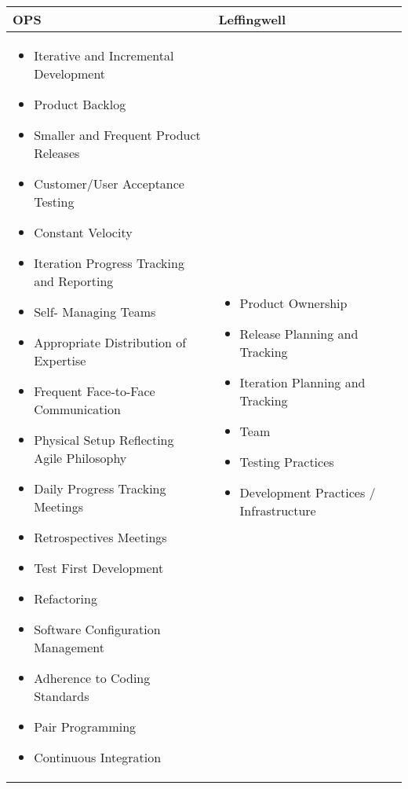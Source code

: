 \begin{tabular}{| p{7.5cm} | p{7cm} |}
	\hline
	\textbf{OPS} & \textbf{Leffingwell}  \\ \hline
     	\begin{itemize}
     		\item {\color{DeepPink1} Iterative and Incremental Development}
     	    \item {\color{DeepPink1}Product Backlog}
     		\item {\color{green4}Smaller and Frequent Product Releases} 
     		\item {\color{RoyalBlue1}Customer/User {\color{green4}Acceptance Testing}}  
     		\item {\color{RoyalBlue1}Constant Velocity}		
     		\item {\color{RoyalBlue1}Iteration Progress Tracking and Reporting}
     		\item {\color{DarkRed}Self-} {\color{green4}Mana}{\color{RoyalBlue1}ging} {\color{DarkMagenta}Teams} 
     		\item {\color{DarkRed}Appropriate Distribution of Expertise}
     		\item {\color{DarkRed}Frequent Face-to-Face Communication} 
     		\item {\color{DarkRed}Physical Setup Reflecting Agile Philosophy}
     		\item {\color{DarkRed}Daily Progress Tracking Meetings}
     		\item {\color{DarkRed}Retro}{\color{RoyalBlue1}spectives} {\color{green4}Meetings} 
     		\item {\color{DarkOrange1}Test First Development}
     		\item {\color{DarkMagenta}Refactoring}
     		\item {\color{DarkMagenta}Software Configuration Management} 
     		\item {\color{DarkMagenta}Adherence to Coding Standards} 
     		\item {\color{DarkMagenta}Pair Programming}
     		\item {\color{DarkMagenta}Continuous} {\color{DarkOrange1}Integration}
     	\end{itemize} 
     	& \begin{itemize} 
     		\item {\color{DeepPink1}Product Ownership}
     		\item {\color{green4}Release Planning and Tracking}
     		\item {\color{RoyalBlue1}Iteration Planning and Tracking} 
     		\item {\color{DarkRed}Team}
     		\item {\color{DarkOrange1}Testing Practices}
     		\item {\color{DarkMagenta}Development Practices / Infrastructure}  	
 		\end{itemize} 
     \\ \hline
\end{tabular}
\label{table:opp_leffingwell_practices}


